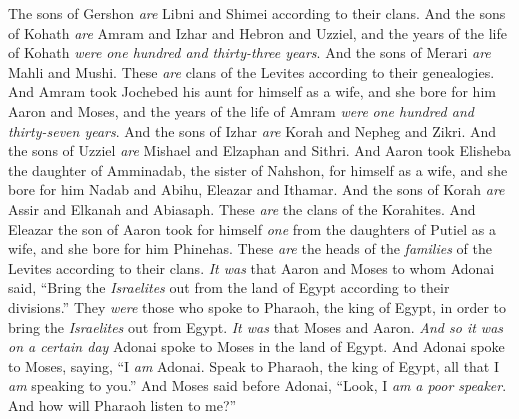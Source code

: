 \begin{biblechapter}
\verse The sons of Gershon \textit{are} Libni and Shimei according to their clans.
\verse And the sons of Kohath \textit{are} Amram and Izhar and Hebron and Uzziel, and the years of the life of Kohath \textit{were} \textit{one hundred and thirty-three years}.
\verse And the sons of Merari \textit{are} Mahli and Mushi. These \textit{are} clans of the Levites according to their genealogies.
\verse And Amram took Jochebed his aunt for himself as a wife, and she bore for him Aaron and Moses, and the years of the life of Amram \textit{were} \textit{one hundred and thirty-seven years}.
\verse And the sons of Izhar \textit{are} Korah and Nepheg and Zikri.
\verse And the sons of Uzziel \textit{are} Mishael and Elzaphan and Sithri.
\verse And Aaron took Elisheba the daughter of Amminadab, the sister of Nahshon, for himself as a wife, and she bore for him Nadab and Abihu, Eleazar and Ithamar.
\verse And the sons of Korah \textit{are} Assir and Elkanah and Abiasaph. These \textit{are} the clans of the Korahites.
\verse And Eleazar the son of Aaron took for himself \textit{one} from the daughters of Putiel as a wife, and she bore for him Phinehas. These \textit{are} the heads of the \textit{families} of the Levites according to their clans.
\verse \textit{It was} that Aaron and Moses to whom Adonai said, “Bring the \textit{Israelites} out from the land of Egypt according to their divisions.”
\verse They \textit{were} those who spoke to Pharaoh, the king of Egypt, in order to bring the \textit{Israelites} out from Egypt. \textit{It was} that Moses and Aaron.
\verse \textit{And so it was on a certain day} Adonai spoke to Moses in the land of Egypt.
\verse And Adonai spoke to Moses, saying, “I \textit{am} Adonai. Speak to Pharaoh, the king of Egypt, all that I \textit{am} speaking to you.”
\verse And Moses said before Adonai, “Look, I \textit{am} \textit{a poor speaker}. And how will Pharaoh listen to me?”
\end{biblechapter}

